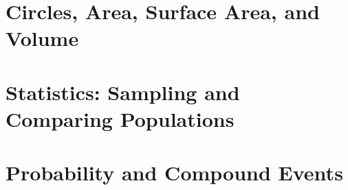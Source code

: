 \documentclass[12pt, fleqn, openany, oneside]{studyGuide}
\begin{document}
\chapter{Circles, Area, Surface Area, and Volume}









\chapter{Statistics: Sampling and Comparing Populations}









\chapter{Probability and Compound Events}









\printAnswerKey
\end{document}
